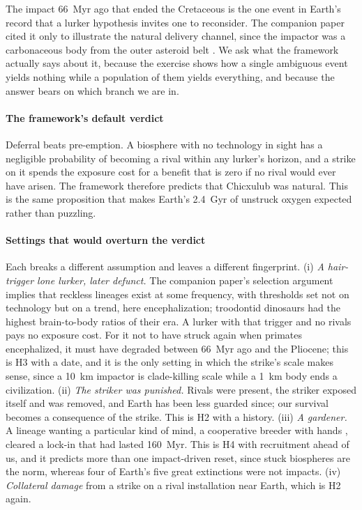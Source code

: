 \documentclass[preprint,12pt]{elsarticle}
\theoremstyle{definition}
\begin{document}
The impact 66~Myr ago that ended the Cretaceous is the one event in Earth's record that a lurker hypothesis invites one to reconsider. The companion paper cited it only to illustrate the natural delivery channel, since the impactor was a carbonaceous body from the outer asteroid belt \citep{FischerGodde2024}. We ask what the framework actually says about it, because the exercise shows how a single ambiguous event yields nothing while a population of them yields everything, and because the answer bears on which branch we are in.

\paragraph{The framework's default verdict} Deferral beats pre-emption. A biosphere with no technology in sight has a negligible probability of becoming a rival within any lurker's horizon, and a strike on it spends the exposure cost for a benefit that is zero if no rival would ever have arisen. The framework therefore predicts that Chicxulub was natural. This is the same proposition that makes Earth's 2.4~Gyr of unstruck oxygen expected rather than puzzling.

\paragraph{Settings that would overturn the verdict} Each breaks a different assumption and leaves a different fingerprint. (i) \emph{A hair-trigger lone lurker, later defunct.} The companion paper's selection argument implies that reckless lineages exist at some frequency, with thresholds set not on technology but on a trend, here encephalization; troodontid dinosaurs had the highest brain-to-body ratios of their era. A lurker with that trigger and no rivals pays no exposure cost. For it not to have struck again when primates encephalized, it must have degraded between 66~Myr ago and the Pliocene; this is H3 with a date, and it is the only setting in which the strike's scale makes sense, since a 10~km impactor is clade-killing scale while a 1~km body ends a civilization. (ii) \emph{The striker was punished.} Rivals were present, the striker exposed itself and was removed, and Earth has been less guarded since; our survival becomes a consequence of the strike. This is H2 with a history. (iii) \emph{A gardener.} A lineage wanting a particular kind of mind, a cooperative breeder with hands \citep{Hrdy2009}, cleared a lock-in that had lasted 160~Myr. This is H4 with recruitment ahead of us, and it predicts more than one impact-driven reset, since stuck biospheres are the norm, whereas four of Earth's five great extinctions were not impacts. (iv) \emph{Collateral damage} from a strike on a rival installation near Earth, which is H2 again.
\end{document}
